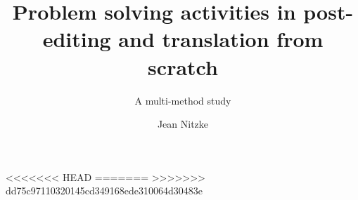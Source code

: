 \author{Jean Nitzke}
\title{Problem solving activities in post-editing and translation from scratch}
\subtitle{A multi-method study}
\renewcommand{\lsSeries}{tmnlp}
\renewcommand{\lsSeriesNumber}{}
<<<<<<< HEAD
=======
\renewcommand{\lsID}{42}
>>>>>>> dd75c97110320145cd349168ede310064d30483e
